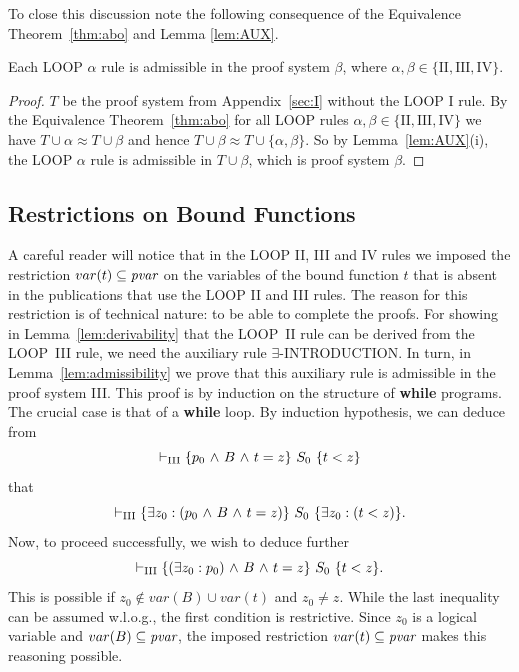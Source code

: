 \documentclass[runningheads]{llncs}       %
\begin{document}
To close this discussion note the following consequence of the Equivalence Theorem~\ref{thm:abo}
and Lemma \ref{lem:AUX}.

\begin{corollary} \label{corr:admiss}
Each {\rm LOOP} $\alpha$ rule is admissible in the proof system $\beta$, 
        where $\alpha, \beta \in \{\mathrm{II, III, IV}\}$.
\end{corollary}


\begin{proof}
  $T$ be the proof system from Appendix~\ref{sec:I} without the LOOP I
  rule.  By the Equivalence Theorem~\ref{thm:abo} for all LOOP rules
  $\alpha, \beta \in \{\mathrm{II, III, IV}\}$ we have
  $T \cup \alpha \approx T \cup \beta$ and hence
  $T \cup \beta \approx T \cup \{\alpha, \beta\}$.  So by
  Lemma~\ref{lem:AUX}(i), the LOOP $\alpha$ rule is 
  admissible in $T \cup \beta$, which is proof system $\beta$.
\HB
\end{proof}



\subsection{Restrictions on Bound Functions}

A careful reader will notice that in the LOOP II, III and IV rules we
imposed the restriction $var(t) \subseteq \mbox{\it pvar}$ on the
variables of the bound function $t$ that is absent in the publications
that use the LOOP II and III rules.
The reason for this restriction is of technical nature: to be able 
to complete the proofs.
For showing in Lemma~\ref{lem:derivability} that the LOOP~II rule can
be derived from the LOOP~III rule, we need the auxiliary rule
$\exists$-INTRODUCTION. In turn, in Lemma~\ref{lem:admissibility}
we prove that this auxiliary rule is admissible in the proof system III.
This proof is by induction on the structure of {\bf while} programs.
The crucial case is that of a {\bf while} loop. By induction hypothesis,
we can deduce from 
\[
 \vdash_{\rm{III}} \mbox{$\{{p_{0} \mbox{$\ \wedge\ $} B \mbox{$\ \wedge\ $} t = z}\}\ {S_0}\ \{{t < z}\}$}
\]
that
\[
 \vdash_{\rm{III}} \mbox{$\{{\mbox{$\exists$} z_0: (p_{0} \mbox{$\ \wedge\ $} B \mbox{$\ \wedge\ $} t = z)}\}\ {S_0}\ \{{\mbox{$\exists$} z_0: (t < z)}\}$}.
\]
Now, to proceed successfully, we wish to deduce further 
\[
 \vdash_{\rm{III}} \mbox{$\{{(\mbox{$\exists$} z_0:p_0) \mbox{$\ \wedge\ $} B \mbox{$\ \wedge\ $} t = z}\}\ {S_0}\ \{{t < z}\}$}.
\]
This is possible if $z_0 \not\in var(B) \cup var(t)$ and $z_0 \neq z$.
While the last inequality can be assumed w.l.o.g., the first condition
is restrictive.
Since $z_0$ is a logical variable and $var(B) \subseteq \mbox{\it pvar}$,
the imposed restriction $var(t) \subseteq \mbox{\it pvar}$ makes this reasoning
possible.
\end{document}
